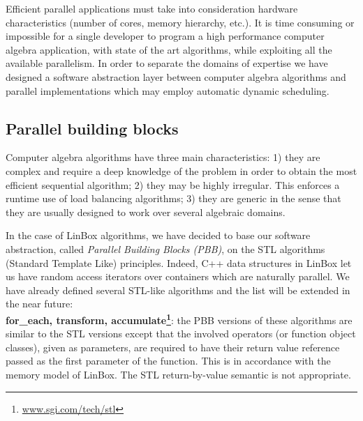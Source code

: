 \documentclass{article}
\newcommand{\linbox}{{\sc LinBox}\xspace}
\begin{document}
Efficient parallel applications must take into consideration hardware
characteristics (number of cores, memory hierarchy, etc.). It is time
consuming or impossible for a single developer to 
program a high performance computer algebra application, with state of
the art algorithms, while exploiting all the available parallelism.  
In order to separate the domains of expertise we have designed a
software abstraction layer between computer algebra algorithms
and parallel implementations which may employ automatic dynamic scheduling.

\subsection{Parallel building blocks}\label{ssec:parallel}
Computer algebra algorithms have three main characteristics:
1) they are complex and require a deep knowledge of the problem in
  order to obtain the most efficient sequential algorithm;
2) they may be highly irregular. This enforces a runtime use of
  load balancing algorithms;
3) they are generic in the sense that they are usually designed
  to work over several algebraic domains.

  In the case of \linbox algorithms, we have decided to base our
  software abstraction, called {\em Parallel Building Blocks (PBB)},
  on the STL algorithms (Standard Template Like) principles.
%
  Indeed, C++ data structures in \linbox let us have random access
  iterators over containers which are naturally parallel. 
% 
  We have already defined several STL-like algorithms and the list
  will be extended in the near future:\\
  {\bf for\_each, transform,
    accumulate\footnote{\url{www.sgi.com/tech/stl}}}: the PBB
  versions of these algorithms are similar to the STL versions 
  except that the involved operators (or function object classes), given as 
  parameters, are required to have their return value reference passed as the
  first parameter of the function. This is in accordance with the memory model 
  of \linbox. 
  The STL return-by-value semantic is not appropriate. 
\end{document}
